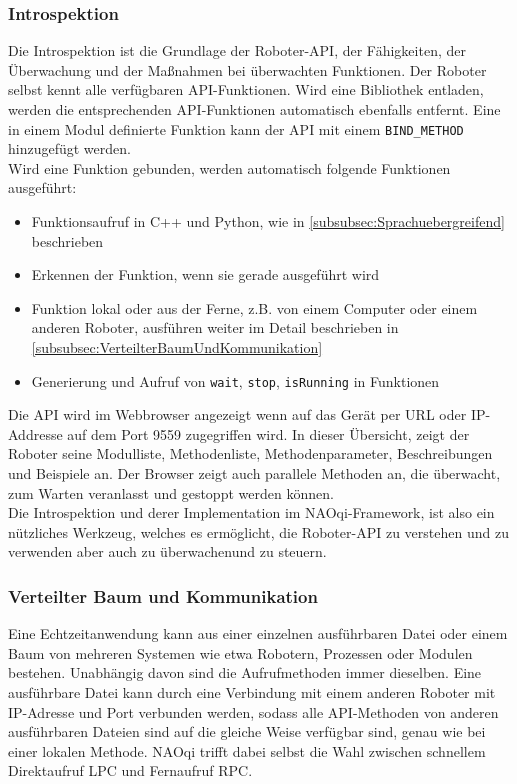 \subsubsection{Introspektion}\label{subsubsec:Introspektion}
Die Introspektion ist die Grundlage der Roboter-\ac{API}, der Fähigkeiten, der Überwachung und der Maßnahmen bei überwachten Funktionen. Der Roboter selbst kennt alle verfügbaren \ac{API}-Funktionen. Wird eine Bibliothek entladen, werden die entsprechenden \ac{API}-Funktionen automatisch ebenfalls entfernt. Eine in einem Modul definierte Funktion kann der \ac{API} mit einem \texttt{BIND\_METHOD} hinzugefügt werden.
\\

\noindent
Wird eine Funktion gebunden, werden automatisch folgende Funktionen ausgeführt:\\
\begin{itemize}
    \item Funktionsaufruf in C++ und Python, wie in \autoref{subsubsec:Sprachuebergreifend} beschrieben
    \item Erkennen der Funktion, wenn sie gerade ausgeführt wird
    \item Funktion lokal oder aus der Ferne, z.B. von einem Computer oder einem anderen Roboter, ausführen weiter im Detail beschrieben in \autoref{subsubsec:VerteilterBaumUndKommunikation}
    \item Generierung und Aufruf von \texttt{wait}, \texttt{stop}, \texttt{isRunning} in Funktionen
\end{itemize}
Die \ac{API} wird im Webbrowser angezeigt wenn auf das Gerät per \ac{URL} oder \ac{IP}-Addresse auf dem Port 9559 zugegriffen wird. In dieser Übersicht, zeigt der Roboter seine Modulliste, Methodenliste, Methodenparameter, Beschreibungen und Beispiele an. Der Browser zeigt auch parallele Methoden an, die überwacht, zum Warten veranlasst und gestoppt werden können.
\\

\noindent
Die Introspektion und derer Implementation im NAOqi-Framework, ist also ein nützliches Werkzeug, welches es ermöglicht, die Roboter-\ac{API} zu verstehen und zu verwenden aber auch zu überwachenund zu steuern.\\

\subsubsection{Verteilter Baum und Kommunikation}\label{subsubsec:VerteilterBaumUndKommunikation}
Eine Echtzeitanwendung kann aus einer einzelnen ausführbaren Datei oder einem Baum von mehreren Systemen wie etwa Robotern, Prozessen oder Modulen bestehen. Unabhängig davon sind die Aufrufmethoden immer dieselben. Eine ausführbare Datei kann durch eine Verbindung mit einem anderen Roboter mit \ac{IP}-Adresse und Port verbunden werden, sodass alle \ac{API}-Methoden von anderen ausführbaren Dateien sind auf die gleiche Weise verfügbar sind, genau wie bei einer lokalen Methode. NAOqi trifft dabei selbst die Wahl zwischen schnellem Direktaufruf \ac{LPC} und Fernaufruf \ac{RPC}.\\

